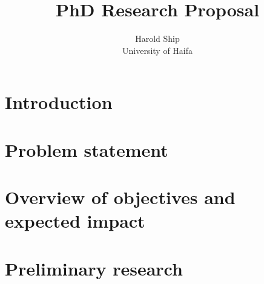 \documentclass[11pt,a4paper,titlepage]{article}
\title{PhD Research Proposal}
\author{Harold Ship \\ University of Haifa}
\theoremstyle{definition}
\begin{document}

\maketitle \clearpage
\tableofcontents \clearpage
\iffalse %
\listoffigures \clearpage
\listoftables \clearpage
\fi
\printglossaries \clearpage


\setcounter{page}{1}


\section{Introduction}
\label{sec:introduction}




\section{Problem statement}
\label{sec:problem-statement}

\section{Overview of objectives and expected impact}
\label{sec:objectives-impact}






\section{Preliminary research}
\label{sec:preliminary-research}


\printbibliography
\label{sec:bibliography}
\end{document}
